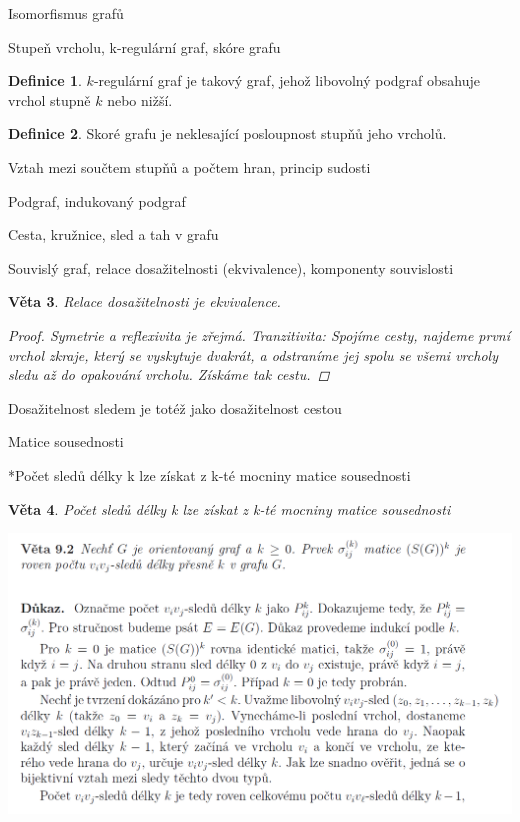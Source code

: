 \documentclass[10pt,a4paper]{article}
\theoremstyle{plain}
\newtheorem{veta}{Věta}
\theoremstyle{definition}
\newtheorem{definice}[veta]{Definice}
\begin{document}
Isomorfismus grafů

Stupeň vrcholu, k-regulární graf, skóre grafu

\begin{definice}
$k$-regulární graf je takový graf, jehož libovolný podgraf obsahuje vrchol stupně $k$ nebo nižší.
\end{definice}

\begin{definice}
Skoré grafu je neklesající posloupnost stupňů jeho vrcholů.
\end{definice}

Vztah mezi součtem stupňů a počtem hran, princip sudosti

Podgraf, indukovaný podgraf

Cesta, kružnice, sled a tah v grafu

Souvislý graf, relace dosažitelnosti (ekvivalence), komponenty souvislosti

\begin{veta}
Relace dosažitelnosti je ekvivalence.
\begin{proof}
Symetrie a reflexivita je zřejmá. Tranzitivita: Spojíme cesty, najdeme první vrchol zkraje, který se vyskytuje dvakrát, a odstraníme jej spolu se všemi vrcholy sledu až do opakování vrcholu. Získáme tak cestu.
\end{proof}
\end{veta}

Dosažitelnost sledem je totéž jako dosažitelnost cestou

Matice sousednosti

*Počet sledů délky k lze získat z k-té mocniny matice sousednosti

\begin{veta}
Počet sledů délky k lze získat z k-té mocniny matice sousednosti
\end{veta}

\includegraphics[scale=0.5]{sousednosti.png} 
\end{document}
